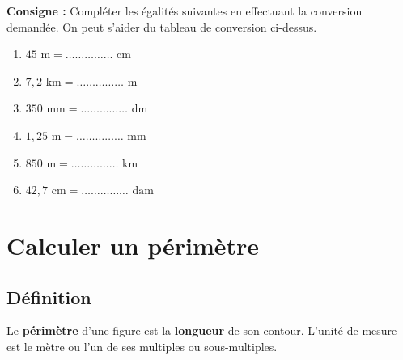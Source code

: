 \documentclass[a4paper]{book}
\begin{document}
    \begin{exemple}
        \textbf{Consigne :} Compléter les égalités suivantes en effectuant la conversion demandée. On peut s'aider du tableau de conversion ci-dessus.
        
    
    \end{exemple}
        \begin{minipage}{0.45\linewidth}
            \begin{enumerate}
                \item $45 \text{ m} = \dots\dots\dots\dots\dots \text{ cm}$
                \item $7,2 \text{ km} = \dots\dots\dots\dots\dots \text{ m}$
                \item $350 \text{ mm} = \dots\dots\dots\dots\dots \text{ dm}$
            \end{enumerate} 
        \end{minipage}
        \hfill \vline \hfill
        \begin{minipage}{0.45\linewidth}
            \begin{enumerate}
                \setcounter{enumi}{3}
                \item $1,25 \text{ m} = \dots\dots\dots\dots\dots \text{ mm}$
                \item $850 \text{ m} = \dots\dots\dots\dots\dots \text{ km}$
                \item $42,7 \text{ cm} = \dots\dots\dots\dots\dots \text{ dam}$
            \end{enumerate} 
        \end{minipage}


\section{Calculer un périmètre}
\subsection{Définition}
    \begin{definition}[Périmètre]
        Le \textbf{périmètre} d'une figure est la \textbf{longueur} de son contour. L’unité de mesure est le mètre ou l'un de ses multiples ou sous-multiples.
    \end{definition}
\end{document}
